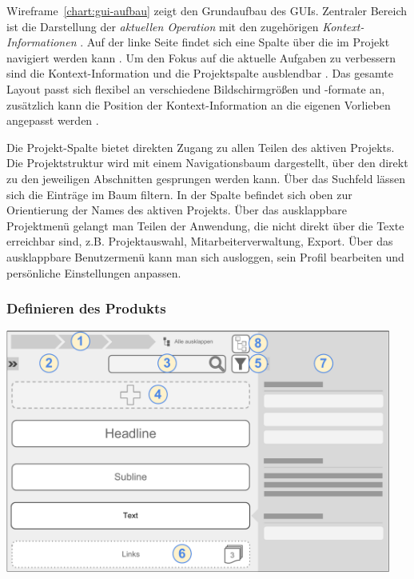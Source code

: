 Wireframe~\ref{chart:gui-aufbau} zeigt den Grundaufbau des GUIs. Zentraler Bereich ist die Darstellung der \emph{aktuellen Operation}  mit den zugehörigen \emph{Kontext-Informationen} . Auf der linke Seite findet sich eine Spalte über die im Projekt navigiert werden kann . Um den Fokus auf die aktuelle Aufgaben zu verbessern sind die Kontext-Information und die Projektspalte ausblendbar . Das gesamte Layout passt sich flexibel an verschiedene Bildschirmgrößen und -formate an, zusätzlich kann die Position der Kontext-Information an die eigenen Vorlieben angepasst werden .

Die Projekt-Spalte  bietet direkten Zugang zu allen Teilen des aktiven Projekts. Die Projektstruktur wird mit einem Navigationsbaum dargestellt, über den direkt zu den jeweiligen Abschnitten gesprungen werden kann. Über das Suchfeld lässen sich die Einträge im Baum filtern. In der Spalte befindet sich oben zur Orientierung der Names des aktiven Projekts. Über das ausklappbare Projektmenü gelangt man Teilen der Anwendung, die nicht direkt über die Texte erreichbar sind, z.B. Projektauswahl, Mitarbeiterverwaltung, Export. Über das ausklappbare Benutzermenü kann man sich ausloggen, sein Profil bearbeiten und persönliche Einstellungen anpassen.

\pagebreak

\subsubsection{Definieren des Produkts}\label{l:gui-definition}

\begin{center}
\includegraphics[width=0.95\textwidth]{media/GUIProduktstruktur.pdf}
\label{chart:gui-produktstruktur}
\end{center}

